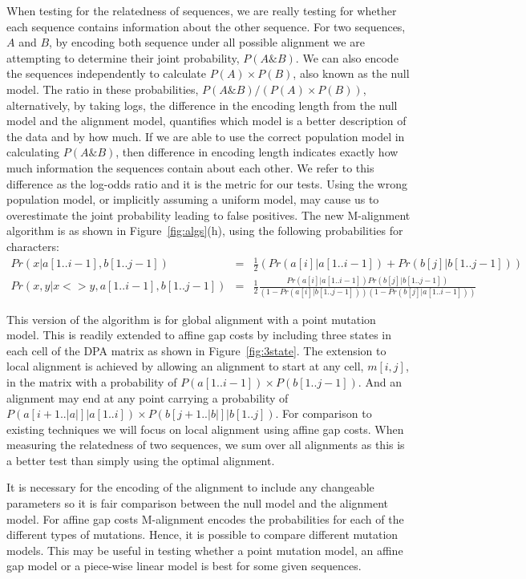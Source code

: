 \documentclass[letterpaper,11pt,oneside]{article}
\begin{document}
When testing for the relatedness of sequences, we are really testing for
whether each sequence contains information about the other sequence.  For two
sequences, $A$ and $B$, by encoding both sequence under all possible alignment
we are attempting to determine their joint probability, $P(A \& B)$.  We can
also encode the sequences independently to calculate $P(A) \times P(B)$, also
known as the null model.  The ratio in these probabilities, $P(A \& B) / (P(A)
\times P(B))$, alternatively, by taking logs, the difference in the encoding
length from the null model and the alignment model, quantifies which model is
a better description of the data and by how much.  If we are able to use the
correct population model in calculating $P(A\&B)$, then difference in encoding
length indicates exactly how much information the sequences contain about each
other.  We refer to this difference as the log-odds ratio and it is the metric
for our tests. Using the wrong population model, or implicitly assuming a
uniform model, may cause us to overestimate the joint probability leading to
false positives.
\newpage
The new M-alignment algorithm is as shown in Figure~\ref{fig:algs}(h), using
the following probabilities for characters:
\begin{eqnarray*}
Pr(x|a[1..i-1],b[1..j-1]) & = & \frac{1}{2} ( Pr(a[i]|a[1..i-1]) +
Pr(b[j]|b[1..j-1]) ) \\
Pr(x,y|x<>y,a[1..i-1],b[1..j-1]) & = & \frac{1}{2}\frac{Pr(a[i]|a[1..i-1])
Pr(b[j]|b[1..j-1])}{(1-Pr(a[i]|b[1..j-1]))(1-Pr(b[j]|a[1..i-1]))}
\end{eqnarray*}

This version of the algorithm is for global alignment with a point mutation
model.  This is readily extended to affine gap costs by including three states
in each cell of the DPA matrix as shown in Figure~\ref{fig:3state}.  The
extension to local alignment is achieved by allowing an alignment to start at
any cell, $m[i,j]$, in the matrix with a probability of $P(a[1..i-1]) \times
P(b[1..j-1])$.  And an alignment may end at any point carrying a probability
of $P(a[i+1..|a|] | a[1..i]) \times P(b[j+1..|b|] | b[1..j])$.  For comparison
to existing techniques we will focus on local alignment using affine gap
costs.  When measuring the relatedness of two sequences, we sum over all
alignments as this is a better test than simply using the optimal alignment.

It is necessary for the encoding of the alignment to include any changeable
parameters so it is fair comparison between the null model and the alignment
model.  For affine gap costs M-alignment encodes the probabilities for each of
the different types of mutations.  Hence, it is possible to compare different
mutation models.  This may be useful in testing whether a point mutation
model, an affine gap model or a piece-wise linear model is best for some given
sequences.
\end{document}

